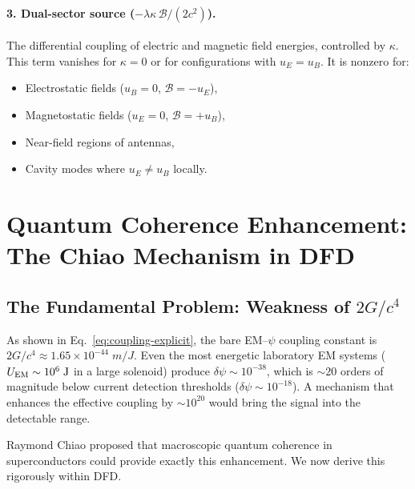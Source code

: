 \documentclass[aps,prd,twocolumn,superscriptaddress,floatfix,nofootinbib]{revtex4-2}
\newcommand{\lam}{\lambda}
\newcommand{\kap}{\kappa}
\newcommand{\calB}{\mathcal{B}}
\begin{document}
\paragraph{3. Dual-sector source ($-\lam\kap\,\calB/(2c^2)$).}
The differential coupling of electric and magnetic field energies,
controlled by $\kap$. This term vanishes for $\kap = 0$ or for
configurations with $u_E = u_B$. It is nonzero for:
\begin{itemize}[nosep]
\item Electrostatic fields ($u_B = 0$, $\calB = -u_E$),
\item Magnetostatic fields ($u_E = 0$, $\calB = +u_B$),
\item Near-field regions of antennas,
\item Cavity modes where $u_E \neq u_B$ locally.
\end{itemize}


\section{Quantum Coherence Enhancement: The Chiao Mechanism in DFD}
\label{sec:chiao}

\subsection{The Fundamental Problem: Weakness of $2G/c^4$}
\label{sec:weakness}

As shown in Eq.~\eqref{eq:coupling-explicit}, the bare EM--$\psi$
coupling constant is $2G/c^4 \approx 1.65 \times 10^{-44}\;\si{m/J}$.
Even the most energetic laboratory EM systems ($U_{\rm EM} \sim
10^6\;\si{J}$ in a large solenoid) produce $\delta\psi \sim 10^{-38}$,
which is $\sim 20$ orders of magnitude below current detection
thresholds ($\delta\psi \sim 10^{-18}$). A mechanism that enhances
the effective coupling by $\sim 10^{20}$ would bring the signal into
the detectable range.

Raymond Chiao proposed that macroscopic quantum coherence in
superconductors could provide exactly this enhancement. We now derive
this rigorously within DFD.
\end{document}
